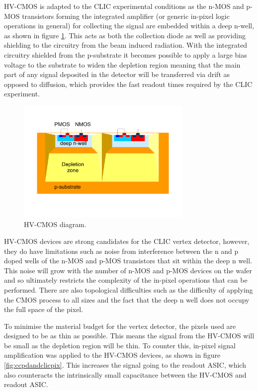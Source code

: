HV-CMOS is adapted to the CLIC experimental conditions as the n-MOS and p-MOS transistors forming the integrated amplifier (or generic in-pixel logic operations in general) for collecting the signal are embedded within a deep n-well, as shown in figure \ref{fig:hvcmos}.  This acts as both the collection diode as well as providing shielding to the circuitry from the beam induced radiation.  With the integrated circuitry shielded from the p-substrate it becomes possible to apply a large bias voltage to the substrate to widen the depletion region meaning that the main part of any signal deposited in the detector will be transferred via drift as opposed to diffusion, which provides the fast readout times required by the CLIC experiment.  

\begin{figure}
\centering
\includegraphics[width=0.75\textwidth]{CLICdpVertex/Plots/HV-CMOSDiagram.pdf}
\caption[HV-CMOS diagram.]{HV-CMOS diagram.}
\label{fig:hvcmos}
\end{figure}

HV-CMOS devices are strong candidates for the CLIC vertex detector, however, they do have limitations such as noise from interference between the n and p doped wells of the n-MOS and p-MOS transistors that sit within the deep n well.  This noise will grow with the number of n-MOS and p-MOS devices on the wafer and so ultimately restricts the complexity of the in-pixel operations that can be performed.  There are also topological difficulties such as the difficulty of applying the CMOS process to all sizes and the fact that the deep n well does not occupy the full space of the pixel.  

To minimise the material budget for the vertex detector, the pixels used are designed to be as thin as possible.  This means the signal from the HV-CMOS will be small as the depletion region will be thin.  To counter this, in-pixel signal amplification was applied to the HV-CMOS devices, as shown in figure \ref{fig:ccpdandclicpix}.  This increases the signal going to the readout ASIC, which also counteracts the intrinsically small capacitance between the HV-CMOS and readout ASIC.


